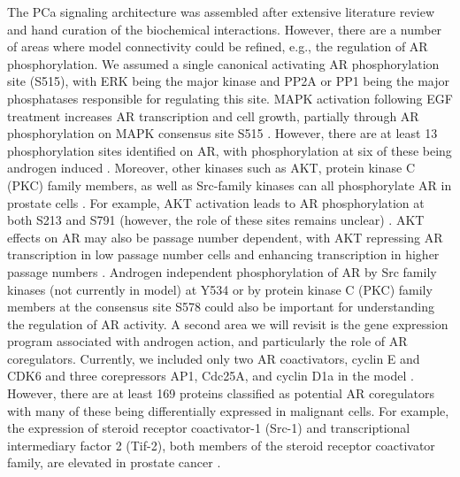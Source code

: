 \documentclass[12pt]{article}
\begin{document}


The PCa signaling architecture was assembled after extensive literature review and hand curation of the biochemical interactions.
However, there are a number of areas where model connectivity could be refined, e.g., the regulation of AR phosphorylation.
We assumed a single canonical activating AR phosphorylation site (S515), with ERK being the major kinase and PP2A or PP1 being the major phosphatases responsible for regulating this site.  
MAPK activation following EGF treatment increases AR transcription and cell growth, partially through AR phosphorylation on MAPK consensus site S515 \cite{Ponguta2008}.
However, there are at least 13 phosphorylation sites identified on AR, with phosphorylation at six of these being androgen induced \cite{Gioeli2012}. 
Moreover, other kinases such as AKT, protein kinase C (PKC) family members, as well as Src-family kinases can all phosphorylate AR in prostate cells \cite{Guo2006,Ponguta2008}. 
For example, AKT activation leads to AR  phosphorylation at both S213 and S791 (however, the role of these sites remains unclear) \cite{Wen2000,Lin2001PNAS,Taneja2005,Lin2003}.  
AKT effects on AR may also be passage number dependent, with AKT repressing AR transcription in low passage number cells and enhancing transcription in higher passage numbers \cite{Lin2003}. 
Androgen independent phosphorylation of AR by Src family kinases (not currently in model) at Y534 \cite{Guo2006} or by protein kinase C (PKC) family members at the consensus site S578 could also be important for understanding the regulation of AR activity. 
A second area we will revisit is the gene expression program associated with androgen action, and particularly the role of AR coregulators.
Currently, we included only two AR coactivators, cyclin E and CDK6 \cite{Yamamoto2000,Lim2005} and three corepressors AP1, Cdc25A, and cyclin D1a in the model \cite{Sato1997,Chiu2009,Petre-Draviam2003}. 
However, there are at least 169 proteins classified as potential AR coregulators \cite{Heinlein:2002qy,Heemers2007} with many of these being differentially expressed in malignant cells.
For example, the expression of steroid receptor coactivator-1 (Src-1) and transcriptional intermediary factor 2 (Tif-2), both members of the steroid receptor coactivator family, are elevated in prostate cancer \cite{Gregory2001,Gregory2004}. 
\end{document}
